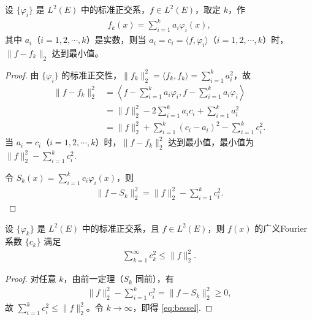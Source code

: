 \documentclass[../../main.tex]{subfiles}%
\begin{document}
\begin{theorem}
设 $\{\varphi_i\}$ 是 $L^2(E)$ 中的标准正交系，$f \in L^2(E)$，取定 $k$，作
\begin{align*}
f_k(x) = \sum_{i=1}^k a_i \varphi_i(x),
\end{align*}
其中 $a_i$（$i=1,2,\cdots,k$）是实数，则当 $a_i = c_i = \langle f, \varphi_i \rangle$（$i=1,2,\cdots,k$）时，$\|f - f_k\|_2$ 达到最小值。
\end{theorem}
\begin{proof}
由 $\{\varphi_i\}$ 的标准正交性，$\|f_k\|_2^2 = \langle f_k, f_k \rangle = \sum\limits_{i=1}^k a_i^2$，故
\begin{align*}
\|f - f_k\|_2^2 &= \left\langle f - \sum_{i=1}^k a_i \varphi_i, f - \sum_{i=1}^k a_i \varphi_i \right\rangle \\
&= \|f\|_2^2 - 2\sum_{i=1}^k a_i c_i + \sum_{i=1}^k a_i^2 \\
&= \|f\|_2^2 + \sum_{i=1}^k (c_i - a_i)^2 - \sum_{i=1}^k c_i^2.
\end{align*}
当 $a_i = c_i$（$i=1,2,\cdots,k$）时，$\|f - f_k\|_2^2$ 达到最小值，最小值为 $\|f\|_2^2 - \sum\limits_{i=1}^k c_i^2$.

令 $S_k(x) = \sum\limits_{i=1}^k c_i \varphi_i(x)$，则
\begin{align*}
\|f - S_k\|_2^2 = \|f\|_2^2 - \sum_{i=1}^k c_i^2.
\end{align*}
\end{proof}

\begin{theorem}[Bessel不等式]\label{theorem:实变函数--Bessel不等式}
设 $\{\varphi_k\}$ 是 $L^2(E)$ 中的标准正交系，且 $f \in L^2(E)$，则 $f(x)$ 的广义Fourier系数 $\{c_k\}$ 满足
\begin{align}
\sum_{k=1}^\infty c_k^2 \leqslant \|f\|_2^2. \label{eq:bessel}
\end{align}
\end{theorem}
\begin{proof}
对任意 $k$，由前一定理（$S_k$ 同前），有
\begin{align*}
\|f\|_2^2 - \sum_{i=1}^k c_i^2 = \|f - S_k\|_2^2 \geqslant 0,
\end{align*}
故 $\sum\limits_{i=1}^k c_i^2 \leqslant \|f\|_2^2$。令 $k \to \infty$，即得 \eqref{eq:bessel}.
\end{proof}
\end{document}

